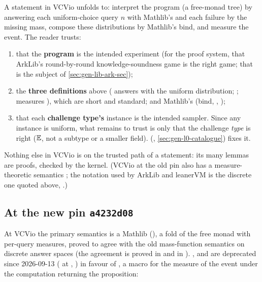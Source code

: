 A statement  in VCVio unfolds to: interpret the program  (a
free-monad tree) by answering each uniform-choice query $n$ with Mathlib's
\allowbreak{} and each  failure by the missing mass,
compose these distributions by Mathlib's  bind, and measure the event. The reader
trusts:
\begin{enumerate}
\item that the \textbf{program}  is the intended experiment (for the proof system,
  that ArkLib's round-by-round knowledge-soundness game is the right game; that is the subject of
  \cref{sec:gen-lib-ark-sec});
\item the \textbf{three definitions} above ( answers with the
  uniform distribution; ;  measures
  ), which are short and standard; and Mathlib's  (bind,
  , );
\item that each \textbf{challenge type's}  instance is the intended
  sampler. Since any instance is uniform, what remains to trust is only that the challenge
  \emph{type} is right ($\mathbb{E}$, not a subtype or a smaller field).
   (, \cref{sec:gen-l0-catalogue}) fixes it.
\end{enumerate}
Nothing else in VCVio is on the trusted path of a statement: its many lemmas are proofs, checked
by the kernel. (VCVio at the old pin also has a measure-theoretic semantics ; the
 notation used by ArkLib and leanerVM is the discrete  one quoted above,
\allowbreak{}.)

\subsection{At the new pin \texorpdfstring{\texttt{a4232d08}}{a4232d08}}\label{sec:gen-lib-vcvio-new}

\begin{sloppypar}
At VCVio  the primary semantics is a Mathlib  (), a
fold of the free monad with per-query measures, proved to agree with the old mass-function
semantics on discrete answer spaces (the agreement is proved in
\allowbreak{}\allowbreak{} and in
\allowbreak{}). ,  and
 are deprecated since 2026-09-13 (\allowbreak{}\allowbreak{}\allowbreak{}
at , ) in favour of
, a macro for the measure of the event  under the
computation returning the proposition:
\end{sloppypar}

